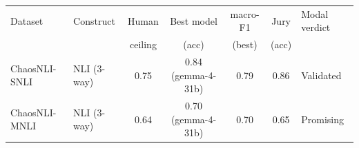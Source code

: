 \begin{tabular}{@{}l l c c c c l@{}}
\toprule
Dataset & Construct & Human & Best model & macro-F1 & Jury & Modal verdict \\
 & & ceiling & (acc) & (best) & (acc) & \\
\midrule
ChaosNLI-SNLI & NLI (3-way) & 0.75 & 0.84 (gemma-4-31b) & 0.79 & 0.86 & \cellcolor{g!55}Validated \\
ChaosNLI-MNLI & NLI (3-way) & 0.64 & 0.70 (gemma-4-31b) & 0.70 & 0.65 & \cellcolor{g!25}Promising \\
\bottomrule
\end{tabular}